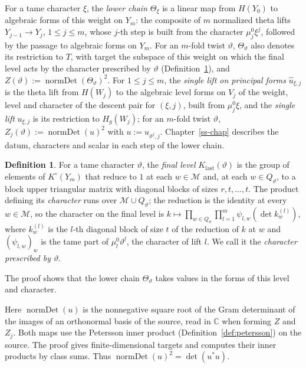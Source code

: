 \documentclass[reqno]{amsart}
\newcounter{chap}
\theoremstyle{plain}
\theoremstyle{definition}
\newtheorem{definition}[theorem]{Definition}
\newcommand{\C}{{\mathbb{C}}}
\begin{document}
For a tame character \(\xi\), the \emph{lower chain} \(\Theta_\xi\) is a linear map from \(H(Y_0)\) to algebraic forms of this weight on \(Y_m\): the composite of \(m\) normalized theta lifts \(Y_{j-1} \to Y_j\), \(1 \le j \le m\), whose \(j\)-th step is built from the character \(\mu_j^0\xi^j\), followed by the passage to algebraic forms on \(Y_m\).  For an \(m\)-fold twist \(\vartheta\), \(\Theta_\vartheta\) also denotes its restriction to \(T\), with target the subspace of this weight on which the final level acts by the character prescribed by \(\vartheta\) (Definition~\ref{def:final-level}), and \(Z(\vartheta) := \operatorname{normDet}(\Theta_\vartheta)^2\).  For \(1 \le j \le m\), the \emph{single lift on principal forms} \(\hat u_{\xi,j}\) is the theta lift from \(H(W_j)\) to the algebraic level forms on \(V_j\) of the weight, level and character of the descent pair for \((\xi, j)\), built from \(\mu_j^0\xi\), and the \emph{single lift} \(u_{\xi,j}\) is its restriction to \(H_g(W_j)\); for an \(m\)-fold twist \(\vartheta\), \(Z_j(\vartheta) := \operatorname{normDet}(u)^2\) with \(u := u_{\vartheta^j, j}\).  Chapter~\ref{ss-chap} describes the datum, characters and scalar in each step of the lower chain.

\begin{definition}\label{def:final-level}
For a tame character \(\vartheta\), the \emph{final level} \(K_{\mathrm{last}}(\vartheta)\) is the group of elements of \(K^\circ(Y_m)\) that reduce to \(1\) at each \(w \in \mathcal M\) and, at each \(w \in Q_\vartheta\), to a block upper triangular matrix with diagonal blocks of sizes \(r, t, \dots, t\).  The product defining its \emph{character} runs over \(\mathcal M \cup Q_\vartheta\); the reduction is the identity at every \(w \in \mathcal M\), so the character on the final level is \(k \mapsto \prod_{w \in Q_\vartheta}\prod_{l=1}^{m}\psi_{l,w}(\det k_w^{(l)})\), where \(k_w^{(l)}\) is the \(l\)-th diagonal block of size \(t\) of the reduction of \(k\) at \(w\) and \((\psi_{l,w})_w\) is the tame part of \(\mu_l^0\vartheta^l\), the character of lift \(l\).  We call it the \emph{character prescribed by \(\vartheta\)}.
\end{definition}

The proof shows that the lower chain \(\Theta_\vartheta\) takes values in the forms of this level and character.

Here \(\operatorname{normDet}(u)\) is the nonnegative square root of the Gram determinant of the images of an orthonormal basis of the source, read in \(\C\) when forming \(Z\) and \(Z_j\).  Both maps use the Petersson inner product (Definition~\ref{def:petersson}) on the source.  The proof gives finite-dimensional targets and computes their inner products by class sums.  Thus \(\operatorname{normDet}(u)^2 = \det(u^*u)\).
\end{document}
